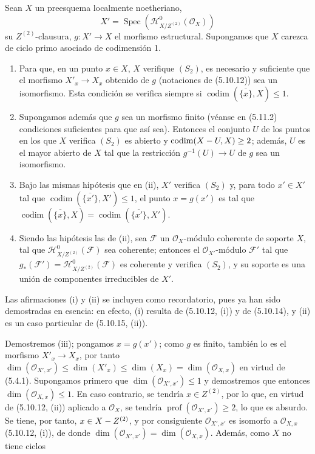 \begin{proposition}[5.10.16]
\label{IV.2.s5.10.16-fr}
Sean $X$ un preesquema localmente noetheriano,
\[
X'=\operatorname{Spec}(\mathcal H^0_{X/Z^{(2)}}(\mathcal O_X))
\]
su $Z^{(2)}$-clausura, $g:X'\to X$ el morfismo estructural. Supongamos que $X$
carezca de ciclo primo asociado de codimensión 1.
\begin{enumerate}
\item[\textup{(i)}] Para que, en un punto $x\in X$, $X$ verifique $(S_2)$, es necesario
y suficiente que el morfismo $X'_x\to X_x$ obtenido de $g$ (notaciones de
\textup{(5.10.12)}) sea un isomorfismo. Esta condición se verifica siempre si
$\operatorname{codim}(\overline{\{x\}},X)\leq1$.
\item[\textup{(ii)}] Supongamos además que $g$ sea un morfismo finito \textup{(véanse en
(5.11.2) condiciones} suficientes \textup{para que así sea)}. Entonces el conjunto $U$
de los puntos en los que $X$ verifica $(S_2)$ es abierto y
$\operatorname{codim}(X- U,X)\geq2$; además, $U$ es el mayor abierto de $X$
tal que la restricción $g^{-1}(U)\to U$ de $g$ sea un isomorfismo.
\item[\textup{(iii)}] Bajo las mismas hipótesis que en \textup{(ii)}, $X'$ verifica $(S_2)$ y,
para todo $x'\in X'$ tal que\linebreak
$\operatorname{codim}(\overline{\{x'\}},X')\leq1$, el punto $x=g(x')$ es tal
que
$\operatorname{codim}(\overline{\{x\}},X)
=\operatorname{codim}(\overline{\{x'\}},X')$.
\item[\textup{(iv)}] Siendo las hipótesis las de \textup{(ii)}, sea $\mathcal F$ un
$\mathcal O_X$-módulo coherente de soporte $X$, tal que
$\mathcal H^0_{X/Z^{(2)}}(\mathcal F)$ sea coherente; entonces el
$\mathcal O_{X'}$-módulo $\mathcal F'$ tal que
$g_*(\mathcal F')=\mathcal H^0_{X/Z^{(2)}}(\mathcal F)$ es coherente y
verifica $(S_2)$, y su soporte es una unión de componentes irreducibles de
$X'$.
\end{enumerate}
\end{proposition}

Las afirmaciones (i) y (ii) se incluyen como recordatorio, pues ya han sido
demostradas en esencia: en efecto, (i) resulta de (5.10.12, (i)) y de
(5.10.14), y (ii) es un caso particular de (5.10.15, (ii)).

Demostremos (iii); pongamos $x=g(x')$; como $g$ es finito, también lo es el
morfismo $X'_x\to X_x$, por tanto
$\dim(\mathcal O_{X',x'})\leq\dim(X'_x)\leq\dim(X_x)
=\dim(\mathcal O_{X,x})$
en virtud de (5.4.1). Supongamos primero que
$\dim(\mathcal O_{X',x'})\leq1$ y demostremos que entonces
$\dim(\mathcal O_{X,x})\leq1$. En caso contrario, se tendría
$x\in Z^{(2)}$, por lo que, en virtud de (5.10.12, (ii)) aplicado a
$\mathcal O_X$, se tendría
$\operatorname{prof}(\mathcal O_{X',x'})\geq2$, lo que es absurdo. Se tiene,
por tanto, $x\in X- Z^{(2)}$, y por consiguiente $\mathcal O_{X',x'}$ es
isomorfo a $\mathcal O_{X,x}$ (5.10.12, (i)), de donde
$\dim(\mathcal O_{X',x'})=\dim(\mathcal O_{X,x})$. Además, como $X$ no tiene
ciclos

